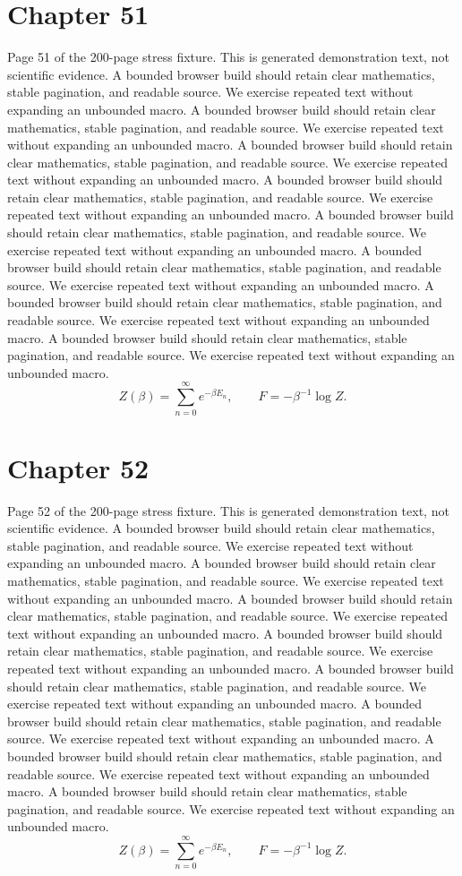 \documentclass[11pt]{article}
\begin{document}
\section*{Chapter 51}
Page 51 of the 200-page stress fixture. This is generated demonstration text, not scientific evidence.
A bounded browser build should retain clear mathematics, stable pagination, and readable source. We exercise repeated text without expanding an unbounded macro.
A bounded browser build should retain clear mathematics, stable pagination, and readable source. We exercise repeated text without expanding an unbounded macro.
A bounded browser build should retain clear mathematics, stable pagination, and readable source. We exercise repeated text without expanding an unbounded macro.
A bounded browser build should retain clear mathematics, stable pagination, and readable source. We exercise repeated text without expanding an unbounded macro.
A bounded browser build should retain clear mathematics, stable pagination, and readable source. We exercise repeated text without expanding an unbounded macro.
A bounded browser build should retain clear mathematics, stable pagination, and readable source. We exercise repeated text without expanding an unbounded macro.
A bounded browser build should retain clear mathematics, stable pagination, and readable source. We exercise repeated text without expanding an unbounded macro.
A bounded browser build should retain clear mathematics, stable pagination, and readable source. We exercise repeated text without expanding an unbounded macro.
\[Z(\beta)=\sum_{n=0}^{\infty}e^{-\beta E_n},\qquad F=-\beta^{-1}\log Z.\]
\newpage
\section*{Chapter 52}
Page 52 of the 200-page stress fixture. This is generated demonstration text, not scientific evidence.
A bounded browser build should retain clear mathematics, stable pagination, and readable source. We exercise repeated text without expanding an unbounded macro.
A bounded browser build should retain clear mathematics, stable pagination, and readable source. We exercise repeated text without expanding an unbounded macro.
A bounded browser build should retain clear mathematics, stable pagination, and readable source. We exercise repeated text without expanding an unbounded macro.
A bounded browser build should retain clear mathematics, stable pagination, and readable source. We exercise repeated text without expanding an unbounded macro.
A bounded browser build should retain clear mathematics, stable pagination, and readable source. We exercise repeated text without expanding an unbounded macro.
A bounded browser build should retain clear mathematics, stable pagination, and readable source. We exercise repeated text without expanding an unbounded macro.
A bounded browser build should retain clear mathematics, stable pagination, and readable source. We exercise repeated text without expanding an unbounded macro.
A bounded browser build should retain clear mathematics, stable pagination, and readable source. We exercise repeated text without expanding an unbounded macro.
\[Z(\beta)=\sum_{n=0}^{\infty}e^{-\beta E_n},\qquad F=-\beta^{-1}\log Z.\]
\newpage
\end{document}
